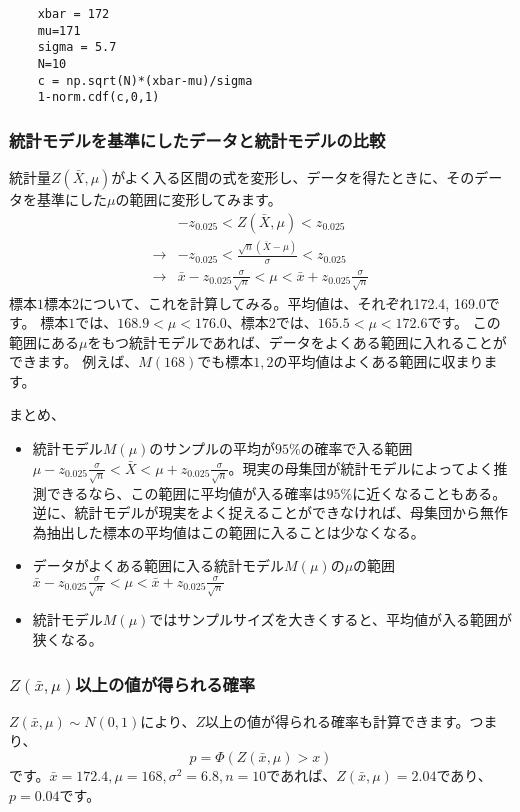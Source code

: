 \documentclass[a4paper,11pt,dvipdfmx]{jsarticle}
\begin{document}
\begin{lstlisting}
    xbar = 172
    mu=171
    sigma = 5.7
    N=10
    c = np.sqrt(N)*(xbar-mu)/sigma
    1-norm.cdf(c,0,1)
\end{lstlisting}
    


\subsubsection{統計モデルを基準にしたデータと統計モデルの比較}
統計量$Z(\bar{X},\mu)$がよく入る区間の式を変形し、データを得たときに、そのデータを基準にした$\mu$の範囲に変形してみます。
\begin{eqnarray*}
 & -z_{0.025} < Z(\bar{X},\mu)<z_{0.025} \\
\rightarrow & -z_{0.025} < \frac{\sqrt{n}(\bar{X}-\mu)}{\sigma}  <z_{0.025} \\
\rightarrow & \bar{x}- z_{0.025}\frac{\sigma}{\sqrt{n}} < \mu < \bar{x} + z_{0.025}\frac{\sigma}{\sqrt{n}}
\end{eqnarray*}
標本$1$標本$2$について、これを計算してみる。平均値は、それぞれ172.4, 169.0です。
標本$1$では、$168.9 < \mu < 176.0$、標本$2$では、$165.5 < \mu <172.6$です。
この範囲にある$\mu$をもつ統計モデルであれば、データをよくある範囲に入れることができます。
例えば、$M(168)$でも標本$1,2$の平均値はよくある範囲に収まります。

まとめ、
\begin{framed}
    \begin{itemize}
        \item 統計モデル$M(\mu)$のサンプルの平均が$95\%$の確率で入る範囲$\mu - z_{0.025} \frac{\sigma}{\sqrt{n}} < \bar{X} < \mu + z_{0.025} \frac{\sigma}{\sqrt{n}}$。現実の母集団が統計モデルによってよく推測できるなら、この範囲に平均値が入る確率は$95\%$に近くなることもある。逆に、統計モデルが現実をよく捉えることができなければ、母集団から無作為抽出した標本の平均値はこの範囲に入ることは少なくなる。
        \item データがよくある範囲に入る統計モデル$M(\mu)$の$\mu$の範囲$\bar{x}- z_{0.025}\frac{\sigma}{\sqrt{n}} < \mu < \bar{x} + z_{0.025}\frac{\sigma}{\sqrt{n}}$
        \item  統計モデル$M(\mu)$ではサンプルサイズを大きくすると、平均値が入る範囲が狭くなる。
    \end{itemize}
\end{framed}

\subsubsection{$Z(\bar{x},\mu)$以上の値が得られる確率}
$Z(\bar{x},\mu)\sim N(0,1)$により、$Z$以上の値が得られる確率も計算できます。つまり、
\begin{equation*}
    p = \varPhi(Z(\bar{x},\mu)>x)
\end{equation*}
です。$\bar{x}=172.4,\mu=168,\sigma^2=6.8,n=10$であれば、$Z(\bar{x},\mu)=2.04$であり、
$p=0.04$です。
\end{document}

